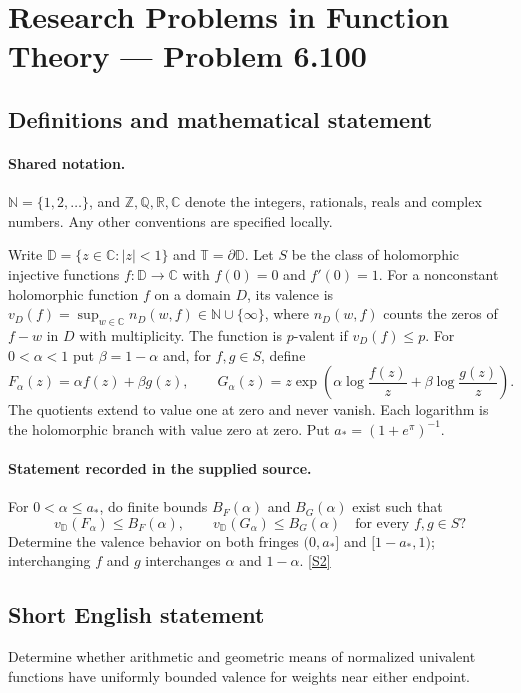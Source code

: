 \documentclass[11pt]{article}
\newcommand{\sref}[2]{\hyperlink{source:#1:#2}{[S#2]}}
\begin{document}
\section{Research Problems in Function Theory — Problem 6.100}\label{statement}

\subsection{Definitions and mathematical statement}

\paragraph{Shared notation.}$\mathbb N=\{1,2,\ldots\}$, and $\mathbb Z,\mathbb Q,\mathbb R,\mathbb C$ denote the integers, rationals, reals and complex numbers. Any other conventions are specified locally.


Write $\mathbb D=\{z\in\mathbb C:|z|<1\}$ and $\mathbb T=\partial\mathbb D$. Let $S$ be the class of holomorphic injective functions $f:\mathbb D\to\mathbb C$ with $f(0)=0$ and $f'(0)=1$. For a nonconstant holomorphic function $f$ on a domain $D$, its valence is $v_D(f)=\sup_{w\in\mathbb C}n_D(w,f)\in\mathbb N\cup\{\infty\}$, where $n_D(w,f)$ counts the zeros of $f-w$ in $D$ with multiplicity. The function is $p$-valent if $v_D(f)\leq p$. For $0<\alpha<1$ put $\beta=1-\alpha$ and, for $f,g\in S$, define
\[F_\alpha(z)=\alpha f(z)+\beta g(z),\qquad
G_\alpha(z)=z\exp\!\left(\alpha\log\frac{f(z)}z+\beta\log\frac{g(z)}z\right).\]
The quotients extend to value one at zero and never vanish. Each logarithm is the holomorphic branch with value zero at zero. Put $a_*=(1+e^{\pi})^{-1}$.
\paragraph{Statement recorded in the supplied source.}
For $0<\alpha\leq a_*$, do finite bounds $B_F(\alpha)$ and $B_G(\alpha)$ exist such that
\[v_{\mathbb D}(F_\alpha)\leq B_F(\alpha),\qquad v_{\mathbb D}(G_\alpha)\leq B_G(\alpha)
\quad\text{for every } f,g\in S?\]
Determine the valence behavior on both fringes $(0,a_*]$ and $[1-a_*,1)$; interchanging $f$ and $g$ interchanges $\alpha$ and $1-\alpha$. \sref{statement}{2}
\subsection{Short English statement}
Determine whether arithmetic and geometric means of normalized univalent functions have uniformly bounded valence for weights near either endpoint.
\end{document}
